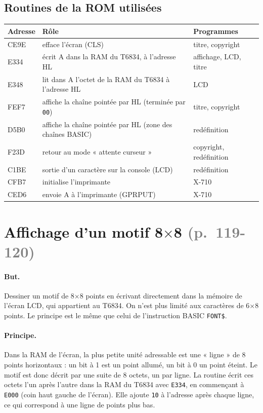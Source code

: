 \documentclass[a4paper,10pt]{article}
\newcommand{\hex}[1]{\texttt{#1}}
\newcommand{\pg}[1]{\texorpdfstring{\textcolor{gray}{\small(p.~#1)}}{}}
\begin{document}
\subsection{Routines de la ROM utilisées}
\begin{center}\small
\begin{tabular}{@{}>{\ttfamily}l>{\raggedright}p{8.5cm}l@{}}
\toprule
\normalfont Adresse & Rôle & Programmes \\
\midrule
CE9E & efface l'écran (CLS) & titre, copyright \\
E334 & écrit A dans la RAM du T6834, à l'adresse HL & affichage, LCD, titre \\
E348 & lit dans A l'octet de la RAM du T6834 à l'adresse HL & LCD \\
FEF7 & affiche la chaîne pointée par HL (terminée par \hex{00}) & titre, copyright \\
D5B0 & affiche la chaîne pointée par HL (zone des chaînes BASIC) & redéfinition \\
F23D & retour au mode « attente curseur » & copyright, redéfinition \\
C1BE & sortie d'un caractère sur la console (LCD) & redéfinition \\
CFB7 & initialise l'imprimante & X-710 \\
CED6 & envoie A à l'imprimante (GPRPUT) & X-710 \\
\bottomrule
\end{tabular}
\end{center}

\section{Affichage d'un motif \texorpdfstring{8$\times$8}{8x8} \pg{119-120}}

\paragraph{But.} Dessiner un motif de 8$\times$8 points en écrivant
directement dans la mémoire de l'écran LCD, qui appartient au T6834. On n'est
plus limité aux caractères de 6$\times$8 points. Le principe est le même que
celui de l'instruction BASIC \texttt{FONT\$}.

\paragraph{Principe.} Dans la RAM de l'écran, la plus petite unité
adressable est une « ligne » de 8 points horizontaux : un bit à 1 est un
point allumé, un bit à 0 un point éteint. Le motif est donc décrit par une
suite de 8 octets, un par ligne. La routine écrit ces octets l'un après
l'autre dans la RAM du T6834 avec \hex{E334}, en commençant à \hex{E000}
(coin haut gauche de l'écran). Elle ajoute \hex{10} à l'adresse après chaque
ligne, ce qui correspond à une ligne de points plus bas.
\end{document}
